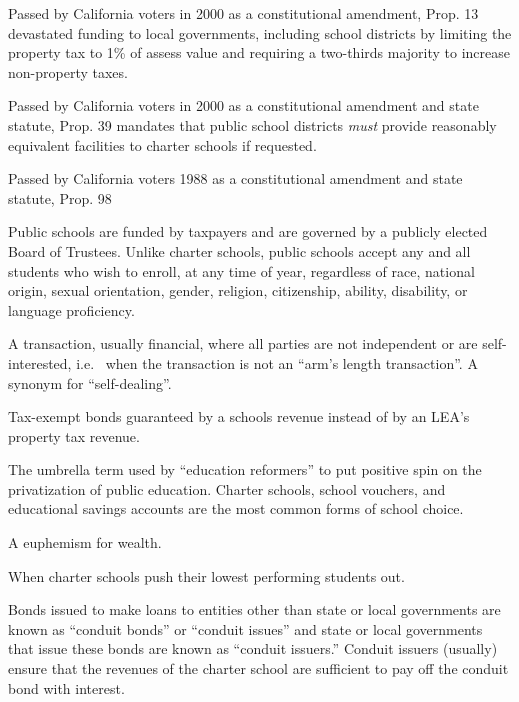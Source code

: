 \begin{description}[nosep]
\medskip\item[Proposition 13] Passed by California voters in 2000 as a constitutional amendment, Prop. 13 devastated funding to local governments, including school districts by limiting the property tax to 1\% of assess value and requiring a two-thirds majority to increase non-property taxes.

\medskip\item[Proposition 39] Passed by California voters in 2000 as a constitutional amendment and state statute, Prop. 39 mandates that public school districts \emph{must} provide reasonably equivalent facilities to charter schools if requested.

\medskip\item[Proposition 98] Passed by California voters 1988 as a constitutional amendment and state statute, Prop. 98 

\medskip\item[public school] Public schools are funded by taxpayers and are governed by a publicly elected Board of Trustees. Unlike charter schools, public schools accept any and all students who wish to enroll, at any time of year, regardless of race, national origin, sexual orientation, gender, religion, citizenship, ability, disability, or language proficiency. 

\medskip\item[related party transaction]  A transaction, usually financial, where all parties are not independent or are self-interested, i.e.  when the transaction is not an ``arm's length transaction''. A synonym for ``self-dealing''.

\medskip\item[revenue bonds] Tax-exempt bonds guaranteed by a schools revenue instead of by an LEA's property tax revenue.

\medskip\item[school choice] The umbrella term used by ``education reformers'' to put positive spin on the privatization of public education. Charter schools, school vouchers, and educational savings accounts are the most common forms of school choice.

\medskip\item[socio-economic status] A euphemism for wealth.

\medskip\item[student pushout] When charter schools push their lowest performing students out.

\medskip\item[tax-exempt conduit bonds] Bonds issued to make loans to entities other than state or local governments are known as
“conduit bonds” or “conduit issues” and state or local governments that issue these bonds are known as “conduit issuers.” Conduit issuers (usually) ensure that the revenues of the charter school are sufficient to pay off the conduit bond with interest.


\end{description}
